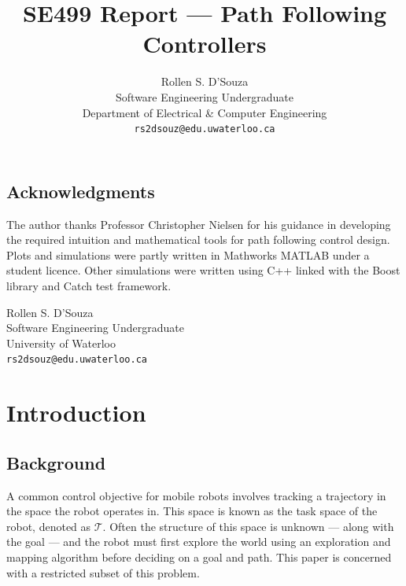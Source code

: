 \documentclass[oneside, 11pt]{book}
\author{{Rollen S. D'Souza}\\
        {Software Engineering Undergraduate}\\
        {Department of Electrical \& Computer Engineering}\\
        {\texttt{rs2dsouz@edu.uwaterloo.ca}}}
\title{\textbf{SE499 Report --- Path Following Controllers}}
\date{}
\begin{document}
\maketitle

\frontmatter
\section*{Acknowledgments}
The author thanks Professor Christopher Nielsen for his guidance in developing the required intuition and mathematical tools for path following control design. Plots and simulations were partly written in Mathworks MATLAB under a student licence. Other simulations were written using C++ linked with the Boost library\cite{boost} and Catch test framework\cite{catch}.

\begin{flushright}
Rollen S. D'Souza\\
Software Engineering Undergraduate\\
University of Waterloo\\
\texttt{rs2dsouz@edu.uwaterloo.ca}
\end{flushright}

\tableofcontents

\printnomenclature[3cm]
\listoffigures
\listoftables


\mainmatter
\pagestyle{fancy}
\renewcommand{\sectionmark}[1]{\markright{\thesection.\ #1}}

\chapter{Introduction}

\section{Background}
A common control objective for mobile robots involves tracking a trajectory in the space the robot operates in. This space is known as the task space of the robot, denoted as $\mathcal{T}$. Often the structure of this space is unknown --- along with the goal --- and the robot must first explore the world using an exploration and mapping algorithm before deciding on a goal and path.  This paper is concerned with a restricted subset of this problem.
\end{document}
